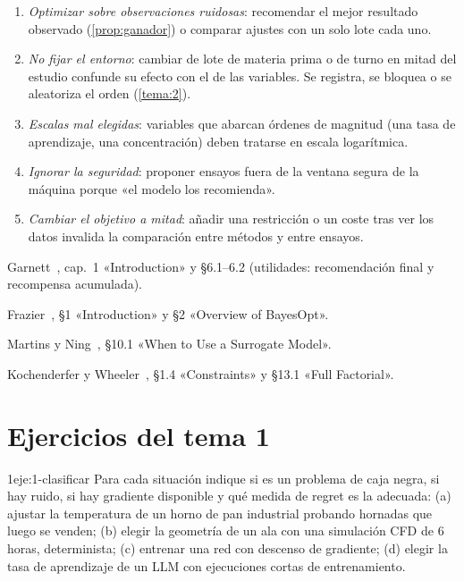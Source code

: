 \begin{observacion}\label{obs:errores1}
\begin{enumerate}
  \item \emph{Optimizar sobre observaciones ruidosas}: recomendar el mejor resultado observado (\cref{prop:ganador}) o comparar ajustes con un solo lote cada uno.
  \item \emph{No fijar el entorno}: cambiar de lote de materia prima o de turno en mitad del estudio confunde su efecto con el de las variables. Se registra, se bloquea o se aleatoriza el orden (\cref{tema:2}).
  \item \emph{Escalas mal elegidas}: variables que abarcan órdenes de magnitud (una tasa de aprendizaje, una concentración) deben tratarse en escala logarítmica.
  \item \emph{Ignorar la seguridad}: proponer ensayos fuera de la ventana segura de la máquina porque «el modelo los recomienda».
  \item \emph{Cambiar el objetivo a mitad}: añadir una restricción o un coste tras ver los datos invalida la comparación entre métodos y entre ensayos.
\end{enumerate}
\end{observacion}

\begin{lecturas}
\item Garnett~\cite{garnett}, cap.~1 «Introduction» y §6.1–6.2 (utilidades: recomendación final y recompensa acumulada).
\item Frazier~\cite{frazier}, §1 «Introduction» y §2 «Overview of BayesOpt».
\item Martins y Ning~\cite{mn}, §10.1 «When to Use a Surrogate Model».
\item Kochenderfer y Wheeler~\cite{kw}, §1.4 «Constraints» y §13.1 «Full Factorial».
\end{lecturas}

\section*{Ejercicios del tema 1}

\begin{ejercicio}{1}{eje:1-clasificar}
Para cada situación indique si es un problema de caja negra, si hay ruido, si hay gradiente disponible y qué medida de regret es la adecuada: (a) ajustar la temperatura de un horno de pan industrial probando hornadas que luego se venden; (b) elegir la geometría de un ala con una simulación CFD de 6 horas, determinista; (c) entrenar una red con descenso de gradiente; (d) elegir la tasa de aprendizaje de un LLM con ejecuciones cortas de entrenamiento.
\end{ejercicio}

